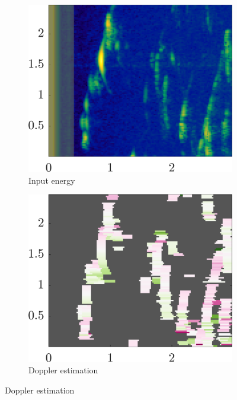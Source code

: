 \begin{figure}[htbp]
    \centering
    \begin{subfigure}[t]{0.32\linewidth}
        \centering
        \includegraphics[width=\linewidth]{gfx/results/attic_input.png}
        \caption{\small Input energy}
    \end{subfigure}%
    \hfill%
    \begin{subfigure}[t]{0.32\linewidth}  
        \centering 
        \includegraphics[width=\linewidth]{gfx/results/attic_doppler.png}
        \caption{\small Doppler estimation}

\end{subfigure}
\end{figure}
